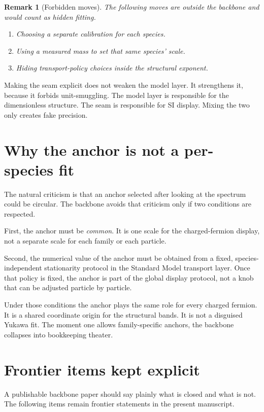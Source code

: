 \documentclass[11pt]{article}
\newtheorem{remark}{Remark}
\begin{document}
\begin{remark}[Forbidden moves]
The following moves are outside the backbone and would count as hidden fitting.
\begin{enumerate}
  \item Choosing a separate calibration for each species.
  \item Using a measured mass to set that same species' scale.
  \item Hiding transport-policy choices inside the structural exponent.
\end{enumerate}
\end{remark}

Making the seam explicit does not weaken the model layer. It strengthens it, because it forbids unit-smuggling. The model layer is responsible for the dimensionless structure. The seam is responsible for SI display. Mixing the two only creates fake precision.

\section{Why the anchor is not a per-species fit}

The natural criticism is that an anchor selected after looking at the spectrum could be circular. The backbone avoids that criticism only if two conditions are respected.

First, the anchor must be \emph{common}. It is one scale for the charged-fermion display, not a separate scale for each family or each particle.

Second, the numerical value of the anchor must be obtained from a fixed, species-independent stationarity protocol in the Standard Model transport layer. Once that policy is fixed, the anchor is part of the global display protocol, not a knob that can be adjusted particle by particle.

Under those conditions the anchor plays the same role for every charged fermion. It is a shared coordinate origin for the structural bands. It is not a disguised Yukawa fit. The moment one allows family-specific anchors, the backbone collapses into bookkeeping theater.

\section{Frontier items kept explicit}

A publishable backbone paper should say plainly what is closed and what is not. The following items remain frontier statements in the present manuscript.
\end{document}
